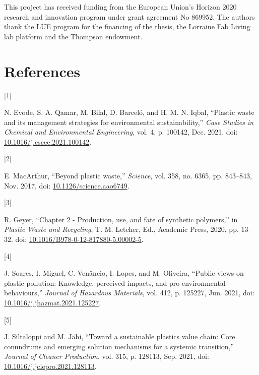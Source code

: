 \documentclass[
]{article}
\newlength{\cslhangindent}
\newlength{\csllabelwidth}
\newlength{\cslentryspacingunit} %
\newenvironment{CSLReferences}[2] %
 {%
  \setlength{\parindent}{0pt}
  \ifodd #1
  \let\oldpar\par
  \def\par{\hangindent=\cslhangindent\oldpar}
  \fi
  \setlength{\parskip}{#2\cslentryspacingunit}
 }%
 {}
\newcommand{\CSLLeftMargin}[1]{\parbox[t]{\csllabelwidth}{#1}}
\newcommand{\CSLRightInline}[1]{\parbox[t]{\linewidth - \csllabelwidth}{#1}\break}
\begin{document}
This project has received funding from the European Union's Horizon 2020
research and innovation program under grant agreement No 869952. The
authors thank the LUE program for the financing of the thesis, the
Lorraine Fab Living lab platform and the Thompson endowment.

\newpage

\hypertarget{references}{%
\section*{References}\label{references}}


\hypertarget{refs}{}
\begin{CSLReferences}{0}{0}
\leavevmode{}%
\CSLLeftMargin{{[}1{]} }%
\CSLRightInline{N. Evode, S. A. Qamar, M. Bilal, D. Barceló, and H. M.
N. Iqbal, {``Plastic waste and its management strategies for
environmental sustainability,''} \emph{Case Studies in Chemical and
Environmental Engineering}, vol. 4, p. 100142, Dec. 2021, doi:
\href{https://doi.org/10.1016/j.cscee.2021.100142}{10.1016/j.cscee.2021.100142}.}

\leavevmode{}%
\CSLLeftMargin{{[}2{]} }%
\CSLRightInline{E. MacArthur, {``Beyond plastic waste,''}
\emph{Science}, vol. 358, no. 6365, pp. 843--843, Nov. 2017, doi:
\href{https://doi.org/10.1126/science.aao6749}{10.1126/science.aao6749}.}

\leavevmode{}%
\CSLLeftMargin{{[}3{]} }%
\CSLRightInline{R. Geyer, {``Chapter 2 - {Production}, use, and fate of
synthetic polymers,''} in \emph{Plastic {Waste} and {Recycling}}, T. M.
Letcher, Ed., {Academic Press}, 2020, pp. 13--32. doi:
\href{https://doi.org/10.1016/B978-0-12-817880-5.00002-5}{10.1016/B978-0-12-817880-5.00002-5}.}

\leavevmode{}%
\CSLLeftMargin{{[}4{]} }%
\CSLRightInline{J. Soares, I. Miguel, C. Venâncio, I. Lopes, and M.
Oliveira, {``Public views on plastic pollution: {Knowledge}, perceived
impacts, and pro-environmental behaviours,''} \emph{Journal of Hazardous
Materials}, vol. 412, p. 125227, Jun. 2021, doi:
\href{https://doi.org/10.1016/j.jhazmat.2021.125227}{10.1016/j.jhazmat.2021.125227}.}

\leavevmode{}%
\CSLLeftMargin{{[}5{]} }%
\CSLRightInline{J. Siltaloppi and M. Jähi, {``Toward a sustainable
plastics value chain: {Core} conundrums and emerging solution mechanisms
for a systemic transition,''} \emph{Journal of Cleaner Production}, vol.
315, p. 128113, Sep. 2021, doi:
\href{https://doi.org/10.1016/j.jclepro.2021.128113}{10.1016/j.jclepro.2021.128113}.}


\end{CSLReferences}
\end{document}
